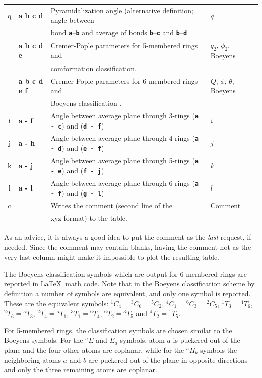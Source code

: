 \documentclass[a4paper,10pt,DIV=15,openany]{scrbook}
\newcommand{\ttt}[1]{\textbf{\texttt{#1}}}
\begin{document}
\begin{table}[htb]
\begin{tabular}{>{\ttfamily}c>{\bfseries\ttfamily}lll}
    q   &a b c d        &Pyramidalization angle (alternative definition; angle between  &$q$\\
                       &&bond \ttt{a}--\ttt{b} and average of bonds \ttt{b}--\ttt{c} and \ttt{b}--\ttt{d}&\\
    5   &a b c d e      &Cremer-Pople parameters for 5-membered rings \cite{Cremer1975JACS} and&$q_2$, $\phi_2$, Boeyens\\
                       && comformation classification.&\\
    6   &a b c d e f    &Cremer-Pople parameters for 6-membered rings \cite{Cremer1975JACS} and&$Q$, $\phi$, $\theta$, Boeyens\\
                       &&Boeyens classification \cite{Boeyens1976JCMS}.&\\
    i   &a - f          &Angle between average plane through 3-rings (\ttt{a - c}) and (\ttt{d - f})      &$i$\\
    j   &a - h          &Angle between average plane through 4-rings (\ttt{a - d}) and (\ttt{e - f})      &$j$\\
    k   &a - j          &Angle between average plane through 5-rings (\ttt{a - e}) and (\ttt{f - j})      &$k$\\
    l   &a - l          &Angle between average plane through 6-rings (\ttt{a - f}) and (\ttt{g - l})      &$l$\\
    c   &               &Writes the comment (second line of the &Comment\\
                       &&xyz format) to the table.&\\
    \hline
  \end{tabular}
\end{table}

As an advice, it is always a good idea to put the comment as the \textit{last} request, if needed. Since the comment may contain blanks, having the comment not as the very last column might make it impossible to plot the resulting table.

The Boeyens classification symbols which are output for 6-membered rings are reported in \LaTeX\ math code. Note that in the Boeyens classification scheme by definition a number of symbols are equivalent, and only one symbol is reported. 
These are the equivalent symbols: $^1C_4={}^3C_6={}^5C_2$, $^4C_1={}^6C_3={}^2C_5$, $^1T_3={}^4T_6$, $^2T_6={}^5T_3$, $^2T_4={}^5T_1$, $^3T_1={}^6T_4$, $^6T_2={}^3T_5$ and $^4T_2={}^1T_5$.

For 5-membered rings, the classification symbols are chosen similar to the Boeyens symbols. For the $^aE$ and $E_a$ symbols, atom $a$ is puckered out of the plane and the four other atoms are coplanar, while for the $^aH_b$ symbols the neighboring atoms $a$ and $b$ are puckered out of the plane in opposite directions and only the three remaining atoms are coplanar.
\end{document}
